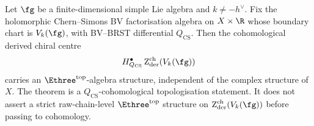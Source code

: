 \begin{theorem}
\label{thm:E3-topological-km}
Let $\fg$ be a finite-dimensional simple Lie algebra and
$k \ne -h^\vee$.  Fix the holomorphic Chern--Simons BV
factorisation algebra on \(X\times\R\) whose boundary chart is
\(V_k(\fg)\), with BV--BRST differential \(Q_{\mathrm{CS}}\).  Then
the cohomological derived chiral centre
\[
H^\bullet_{Q_{\mathrm{CS}}}\Zder^{\mathrm{ch}}(V_k(\fg))
\]
carries an \(\Ethree^{\mathrm{top}}\)-algebra structure, independent
of the complex structure of~\(X\).  The theorem is a
\(Q_{\mathrm{CS}}\)-cohomological topologisation statement.  It does
not assert a strict raw-chain-level \(\Ethree^{\mathrm{top}}\)
structure on \(\Zder^{\mathrm{ch}}(V_k(\fg))\) before passing to
cohomology.
\end{theorem}

